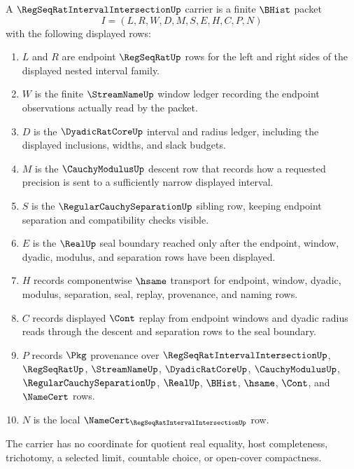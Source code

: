 \begin{definition}
\label{def:regseqrat-interval-intersection-carrier}
A $\RegSeqRatIntervalIntersectionUp$ carrier is a finite $\BHist$ packet
$$
I=(L,R,W,D,M,S,E,H,C,P,N)
$$
with the following displayed rows:
\begin{enumerate}
\item $L$ and $R$ are endpoint $\RegSeqRatUp$ rows for the left and right sides of the displayed nested interval family.
\item $W$ is the finite $\StreamNameUp$ window ledger recording the endpoint observations actually read by the packet.
\item $D$ is the $\DyadicRatCoreUp$ interval and radius ledger, including the displayed inclusions, widths, and slack budgets.
\item $M$ is the $\CauchyModulusUp$ descent row that records how a requested precision is sent to a sufficiently narrow displayed interval.
\item $S$ is the $\RegularCauchySeparationUp$ sibling row, keeping endpoint separation and compatibility checks visible.
\item $E$ is the $\RealUp$ seal boundary reached only after the endpoint, window, dyadic, modulus, and separation rows have been displayed.
\item $H$ records componentwise $\hsame$ transport for endpoint, window, dyadic, modulus, separation, seal, replay, provenance, and naming rows.
\item $C$ records displayed $\Cont$ replay from endpoint windows and dyadic radius reads through the descent and separation rows to the seal boundary.
\item $P$ records $\Pkg$ provenance over $\RegSeqRatIntervalIntersectionUp$, $\RegSeqRatUp$, $\StreamNameUp$, $\DyadicRatCoreUp$, $\CauchyModulusUp$, $\RegularCauchySeparationUp$, $\RealUp$, $\BHist$, $\hsame$, $\Cont$, and $\NameCert$ rows.
\item $N$ is the local $\NameCert_{\RegSeqRatIntervalIntersectionUp}$ row.
\end{enumerate}
The carrier has no coordinate for quotient real equality, host completeness, trichotomy, a selected limit, countable choice, or open-cover compactness.
\end{definition}


